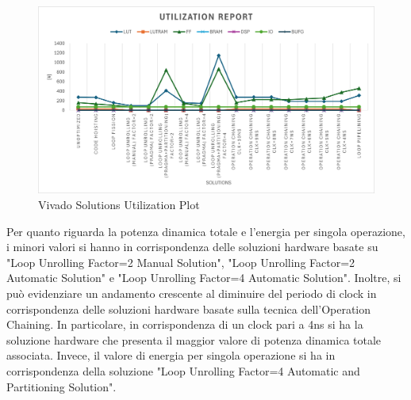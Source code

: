 \begin{figure}[H]
	\centering
	\includegraphics[width=0.6\textheight]{conclusions/utilization.png}
	\caption{Vivado Solutions Utilization Plot}
	\label{fig:vivado-solutions-utilization-plot}
\end{figure}


Per quanto riguarda la potenza dinamica totale e l'energia per singola operazione, i minori valori si hanno in corrispondenza delle soluzioni hardware basate su "Loop Unrolling Factor=2 Manual Solution", "Loop Unrolling Factor=2 Automatic Solution" e "Loop Unrolling Factor=4 Automatic Solution". Inoltre, si può evidenziare un andamento crescente al diminuire del periodo di clock in corrispondenza delle soluzioni hardware basate sulla tecnica dell'Operation Chaining. In particolare, in corrispondenza di un clock pari a 4ns si ha la soluzione hardware che presenta il maggior valore di potenza dinamica totale associata. Invece, il valore di energia per singola operazione si ha in corrispondenza della soluzione "Loop Unrolling Factor=4 Automatic and Partitioning Solution".

